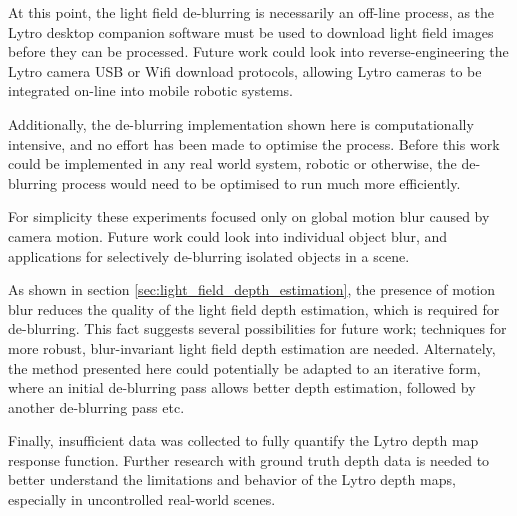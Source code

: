At this point, the light field de-blurring is necessarily an off-line process, as the Lytro desktop companion software must be used to download light field images before they can be processed.
Future work could look into reverse-engineering the Lytro camera USB or Wifi download protocols, allowing Lytro cameras to be integrated on-line into mobile robotic systems. 

Additionally, the de-blurring implementation shown here is computationally intensive, and no effort has been made to optimise the process.
Before this work could be implemented in any real world system, robotic or otherwise, the de-blurring process would need to be optimised to run much more efficiently.

For simplicity these experiments focused only on global motion blur caused by camera motion.
Future work could look into individual object blur, and applications for selectively de-blurring isolated objects in a scene.

As shown in section \ref{sec:light_field_depth_estimation}, the presence of motion blur reduces the quality of the light field depth estimation, which is required for de-blurring.
This fact suggests several possibilities for future work; techniques for more robust, blur-invariant light field depth estimation are needed.
Alternately, the method presented here could potentially be adapted to an iterative form, where an initial de-blurring pass allows better depth estimation, followed by another de-blurring pass etc.

Finally, insufficient data was collected to fully quantify the Lytro depth map response function.
Further research with ground truth depth data is needed to better understand the limitations and behavior of the Lytro depth maps, especially in uncontrolled real-world scenes.

